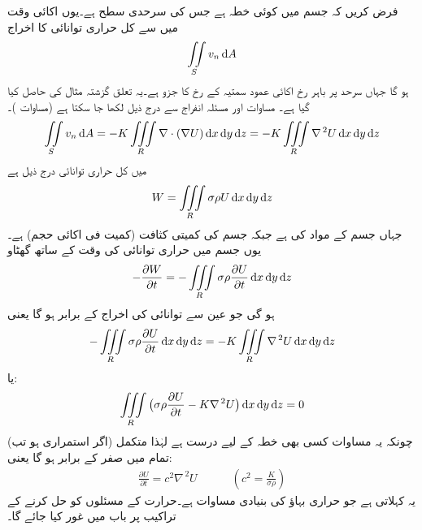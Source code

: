 فرض کریں کہ جسم میں  کوئی خطہ ہے جس کی سرحدی سطح  ہے۔یوں اکائی وقت میں  سے کل حراری توانائی کا اخراج
\begin{align*}
\iint\limits_S v_n \dif A
\end{align*}
ہو گا جہاں  سرحد  پر باہر رخ اکائی عمود سمتیہ  کے رخ   کا جزو ہے۔یہ تعلق گزشتہ مثال کی حاصل کیا گیا ہے۔ مساوات  اور مسئلہ انفراج سے درج ذیل لکھا جا سکتا ہے (مساوات )۔
\begin{align}
\iint\limits_S v_n \dif A=-K\iiint\limits_R \nabla \cdot (\nabla U)\dif x\dif y\dif z=-K\iiint\limits_R \nabla^{\,2}U \dif x\dif y\dif z
\end{align}
  میں کل حراری توانائی  درج ذیل ہے
\begin{align*}
W=\iiint\limits_R \sigma \rho U \dif x\dif y\dif z
\end{align*}
جہاں  جسم کے مواد کی  ہے جبکہ  جسم کی کمیتی کثافت (کمیت فی اکائی حجم) ہے۔یوں جسم میں حراری توانائی کی وقت کے ساتھ گھٹاو 
\begin{align*}
-\frac{\partial W}{\partial t}=-\iiint\limits_R \sigma \rho \frac{\partial U}{\partial t} \dif x\dif y\dif z
\end{align*}
ہو گی جو عین  سے توانائی کی اخراج کے برابر ہو گا یعنی
\begin{align*}
-\iiint\limits_R \sigma \rho \frac{\partial U}{\partial t} \dif x\dif y\dif z=-K\iiint\limits_R \nabla^{\,2}U \dif x\dif y\dif z
\end{align*} 
یا:
\begin{align*}
\iiint\limits_R \big(\sigma \rho\frac{\partial U}{\partial t}-K\nabla^{\,2}U\big)\dif x\dif y\dif z=0
\end{align*}
 چونکہ یہ مساوات کسی بھی خطہ  کے لیے درست ہے لہٰذا متکمل (اگر استمراری ہو تب) تمام  میں صفر کے برابر ہو گا یعنی:
\begin{align}\label{مساوات_خطی_تکمل_حراری_مساوات}
\frac{\partial U}{\partial t}=c^2\nabla^{\,2}U\quad \quad \quad (c^2=\frac{K}{\sigma \rho})
\end{align}
یہ  کہلاتی ہے جو حراری بہاؤ کی بنیادی مساوات ہے۔حرارت کے مسئلوں کو حل کرنے کے تراکیب پر باب  میں غور کیا جائے گا۔

